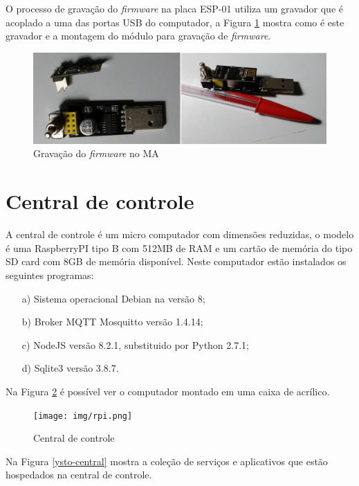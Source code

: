 O processo de gravação do \textit{firmware} na placa ESP-01 utiliza um gravador que é acoplado a uma das portas USB do computador, a Figura \ref{gravacao-firmware} mostra como é este gravador e a montagem do módulo para gravação de \textit{firmware}.

\begin{figure}[H]
\caption{\label{gravacao-firmware} Gravação do \textit{firmware} no MA}
\includegraphics[scale=0.11]{img/gravador-firmware.png}
\end{figure}

\section{Central de controle}
A central de controle é um micro computador com dimensões reduzidas, o modelo é uma RaspberryPI tipo B com 512MB de RAM e um cartão de memória do tipo SD card com 8GB de memória disponível. Neste computador estão instalados os seguintes programas:

\begin{itemize}
    \item[a)] Sistema operacional Debian na versão 8;
    \item[b)] Broker MQTT Mosquitto versão 1.4.14;
    \item[c)] NodeJS versão 8.2.1, substituido por Python 2.7.1;
    \item[d)] Sqlite3 versão 3.8.7.
\end{itemize}

Na Figura \ref{raspberry-case} é possível ver o computador montado em uma caixa de acrílico.

\begin{figure}[H]
\caption{\label{raspberry-case} Central de controle}
\texttt{[image: img/rpi.png]}
\end{figure}

Na Figura \ref{ysto-central} mostra a coleção de serviços e aplicativos que estão hospedados na central de controle.

